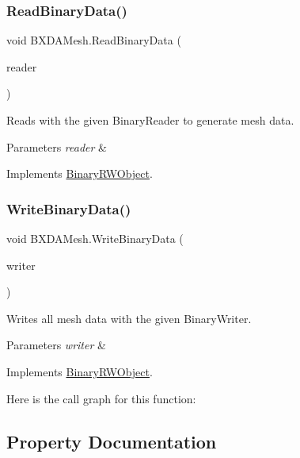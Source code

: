 \subsubsection{\texorpdfstring{Read\+Binary\+Data()}{ReadBinaryData()}}
{\footnotesize\ttfamily void B\+X\+D\+A\+Mesh.\+Read\+Binary\+Data (\begin{DoxyParamCaption}\item[{Binary\+Reader}]{reader }\end{DoxyParamCaption})}



Reads with the given Binary\+Reader to generate mesh data. 


\begin{DoxyParams}{Parameters}
{\em reader} & \\
\hline
\end{DoxyParams}


Implements \hyperlink{interface_binary_r_w_object_a2cd7d6b9aded677cffdb646b51328c5d}{Binary\+R\+W\+Object}.

\mbox{\label{class_b_x_d_a_mesh_a5ee3b3956597c24da796eb6242bb9940}} 
\subsubsection{\texorpdfstring{Write\+Binary\+Data()}{WriteBinaryData()}}
{\footnotesize\ttfamily void B\+X\+D\+A\+Mesh.\+Write\+Binary\+Data (\begin{DoxyParamCaption}\item[{Binary\+Writer}]{writer }\end{DoxyParamCaption})}



Writes all mesh data with the given Binary\+Writer. 


\begin{DoxyParams}{Parameters}
{\em writer} & \\
\hline
\end{DoxyParams}


Implements \hyperlink{interface_binary_r_w_object_a5e361e550b30dcd29759188cf67d177c}{Binary\+R\+W\+Object}.

Here is the call graph for this function\+:


\subsection{Property Documentation}
\mbox{\label{class_b_x_d_a_mesh_ab18fc3dc7b16c729b8ad690d8f89d20c}} 

